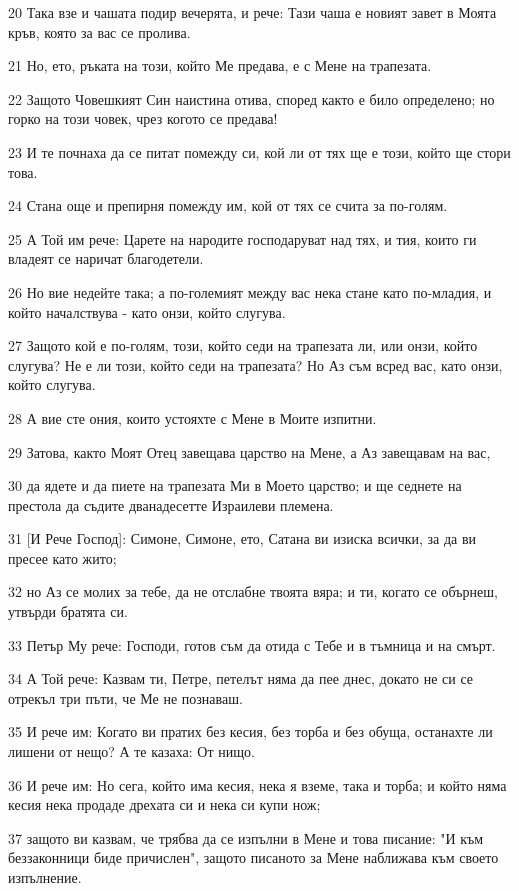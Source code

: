 \par 20 Така взе и чашата подир вечерята, и рече: Тази чаша е новият завет в Моята кръв, която за вас се пролива.
\par 21 Но, ето, ръката на този, който Ме предава, е с Мене на трапезата.
\par 22 Защото Човешкият Син наистина отива, според както е било определено; но горко на този човек, чрез когото се предава!
\par 23 И те почнаха да се питат помежду си, кой ли от тях ще е този, който ще стори това.
\par 24 Стана още и препирня помежду им, кой от тях се счита за по-голям.
\par 25 А Той им рече: Царете на народите господаруват над тях, и тия, които ги владеят се наричат благодетели.
\par 26 Но вие недейте така; а по-големият между вас нека стане като по-младия, и който началствува - като онзи, който слугува.
\par 27 Защото кой е по-голям, този, който седи на трапезата ли, или онзи, който слугува? Не е ли този, който седи на трапезата? Но Аз съм всред вас, като онзи, който слугува.
\par 28 А вие сте ония, които устояхте с Мене в Моите изпитни.
\par 29 Затова, както Моят Отец завещава царство на Мене, а Аз завещавам на вас,
\par 30 да ядете и да пиете на трапезата Ми в Моето царство; и ще седнете на престола да съдите дванадесетте Израилеви племена.
\par 31 [И Рече Господ]: Симоне, Симоне, ето, Сатана ви изиска всички, за да ви пресее като жито;
\par 32 но Аз се молих за тебе, да не отслабне твоята вяра; и ти, когато се обърнеш, утвърди братята си.
\par 33 Петър Му рече: Господи, готов съм да отида с Тебе и в тъмница и на смърт.
\par 34 А Той рече: Казвам ти, Петре, петелът няма да пее днес, докато не си се отрекъл три пъти, че Ме не познаваш.
\par 35 И рече им: Когато ви пратих без кесия, без торба и без обуща, останахте ли лишени от нещо? А те казаха: От нищо.
\par 36 И рече им: Но сега, който има кесия, нека я вземе, така и торба; и който няма кесия нека продаде дрехата си и нека си купи нож;
\par 37 защото ви казвам, че трябва да се изпълни в Мене и това писание: "И към беззаконници биде причислен", защото писаното за Мене наближава към своето изпълнение.
